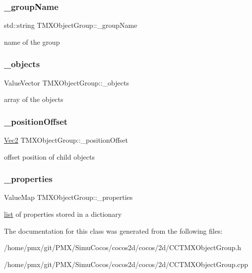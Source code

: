 \subsubsection{\texorpdfstring{\+\_\+group\+Name}{\_groupName}}
{\footnotesize\ttfamily std\+::string T\+M\+X\+Object\+Group\+::\+\_\+group\+Name\hspace{0.3cm}{\ttfamily [protected]}}

name of the group \mbox{\label{classTMXObjectGroup_a4a69a9fd73bfc9d7a75fdfb937fd9be1}} 
\subsubsection{\texorpdfstring{\+\_\+objects}{\_objects}}
{\footnotesize\ttfamily Value\+Vector T\+M\+X\+Object\+Group\+::\+\_\+objects\hspace{0.3cm}{\ttfamily [protected]}}

array of the objects \mbox{\label{classTMXObjectGroup_ae48c8e2c3fe4152c276855f432a50b50}} 
\subsubsection{\texorpdfstring{\+\_\+position\+Offset}{\_positionOffset}}
{\footnotesize\ttfamily \hyperlink{classVec2}{Vec2} T\+M\+X\+Object\+Group\+::\+\_\+position\+Offset\hspace{0.3cm}{\ttfamily [protected]}}

offset position of child objects \mbox{\label{classTMXObjectGroup_ad830297e4e24c6c885980a18f06695e1}} 
\subsubsection{\texorpdfstring{\+\_\+properties}{\_properties}}
{\footnotesize\ttfamily Value\+Map T\+M\+X\+Object\+Group\+::\+\_\+properties\hspace{0.3cm}{\ttfamily [protected]}}

\hyperlink{protocollist-p}{list} of properties stored in a dictionary 

The documentation for this class was generated from the following files\+:\begin{DoxyCompactItemize}
\item 
/home/pmx/git/\+P\+M\+X/\+Simu\+Cocos/cocos2d/cocos/2d/C\+C\+T\+M\+X\+Object\+Group.\+h\item 
/home/pmx/git/\+P\+M\+X/\+Simu\+Cocos/cocos2d/cocos/2d/C\+C\+T\+M\+X\+Object\+Group.\+cpp\end{DoxyCompactItemize}
